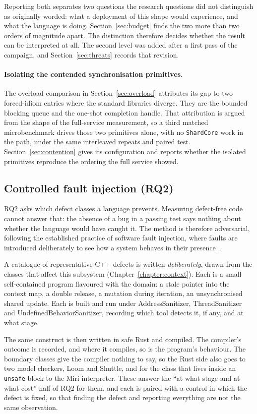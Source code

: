 \documentclass[english,oneside,a4paper,censored,csm,software-track-2020]{HYthesisML}
\begin{document}
Reporting both separates two questions the research questions did not distinguish as originally
worded: what a deployment of this shape would experience, and what the language is doing.
Section~\ref{sec:budget} finds the two more than two orders of magnitude apart. The distinction
therefore decides whether the result can be interpreted at all. The second level was added after
a first pass of the campaign, and Section~\ref{sec:threats} records that revision.

\paragraph{Isolating the contended synchronisation primitives.}
The overload comparison in Section~\ref{sec:overload} attributes its gap to two forced-idiom
entries where the standard libraries diverge. They are the bounded blocking queue and the
one-shot completion handle. That attribution is argued from the shape of the full-service
measurement, so a third matched microbenchmark drives those two primitives alone, with no
\texttt{ShardCore} work in the path, under the same interleaved repeats and paired test.
Section~\ref{sec:contention} gives its configuration and reports whether the isolated primitives
reproduce the ordering the full service showed.

\subsection{Controlled fault injection (RQ2)}\label{sec:methodfaults}
RQ2 asks which defect classes a language prevents. Measuring defect-free code cannot answer
that: the absence of a bug in a passing test says nothing about whether the language would have
caught it. The method is therefore adversarial, following the established practice of software
fault injection, where faults are introduced deliberately to see how a system behaves in their
presence~\cite{natella2016fault}.

A catalogue of representative C++ defects is written \emph{deliberately}, drawn from the classes
that affect this subsystem (Chapter~\ref{chapter:context}). Each is a small self-contained
program flavoured with the domain: a stale pointer into the context map, a double release, a
mutation during iteration, an unsynchronised shared update. Each is built and run under
AddressSanitizer, ThreadSanitizer and UndefinedBehaviorSanitizer, recording which tool detects
it, if any, and at what stage.

The same construct is then written in safe Rust and compiled. The compiler's outcome is
recorded, and where it compiles, so is the program's behaviour. The boundary classes give the
compiler nothing
to say, so the Rust side also goes to two model checkers, Loom and Shuttle, and for the class
that lives inside an \texttt{unsafe} block to the Miri interpreter. These answer the
``at what stage and at what cost'' half of RQ2 for them, and each is paired with a control in
which the defect is fixed, so that finding the defect and reporting everything are not the same
observation.
\end{document}
